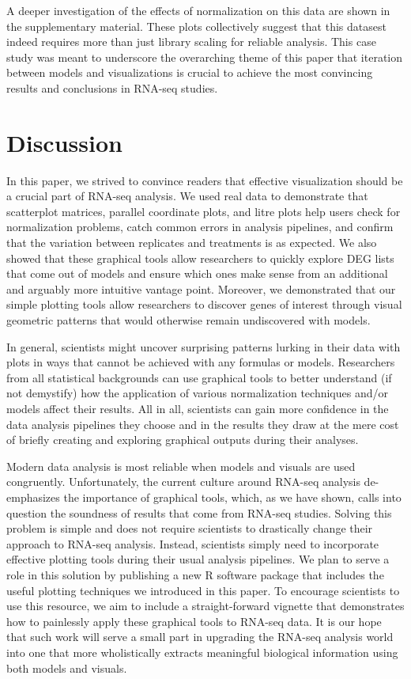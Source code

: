 \documentclass{bioinfo}
\begin{document}
A deeper investigation of the effects of normalization on this data are shown in the supplementary material. These plots collectively suggest that this datasest indeed requires more than just library scaling for reliable analysis. This case study was meant to underscore the overarching theme of this paper that iteration between models and visualizations is crucial to achieve the most convincing results and conclusions in RNA-seq studies.

\section{Discussion}

In this paper, we strived to convince readers that effective visualization should be a crucial part of RNA-seq analysis. We used real data to demonstrate that scatterplot matrices, parallel coordinate plots, and litre plots help users check for normalization problems, catch common errors in analysis pipelines, and confirm that the variation between replicates and treatments is as expected. We also showed that these graphical tools allow researchers to quickly explore DEG lists that come out of models and ensure which ones make sense from an additional and arguably more intuitive vantage point. Moreover, we demonstrated that our simple plotting tools allow researchers to discover genes of interest through visual geometric patterns that would otherwise remain undiscovered with models.

In general, scientists might uncover surprising patterns lurking in their data with plots in ways that cannot be achieved with any formulas or models. Researchers from all statistical backgrounds can use graphical tools to better understand (if not demystify) how the application of various normalization techniques and/or models affect their results. All in all, scientists can gain more confidence in the data analysis pipelines they choose and in the results they draw at the mere cost of briefly creating and exploring graphical outputs during their analyses.

Modern data analysis is most reliable when models and visuals are used congruently. Unfortunately, the current culture around RNA-seq analysis de-emphasizes the importance of graphical tools, which, as we have shown, calls into question the soundness of results that come from RNA-seq studies. Solving this problem is simple and does not require scientists to drastically change their approach to RNA-seq analysis. Instead, scientists simply need to incorporate effective plotting tools during their usual analysis pipelines. We plan to serve a role in this solution by publishing a new \textsf{R} software package that includes the useful plotting techniques we introduced in this paper. To encourage scientists to use this resource, we aim to include a straight-forward vignette that demonstrates how to painlessly apply these graphical tools to RNA-seq data. It is our hope that such work will serve a small part in upgrading the RNA-seq analysis world into one that more wholistically extracts meaningful biological information using both models and visuals.
\end{document}
